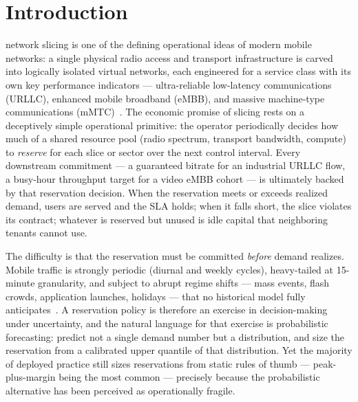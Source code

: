 \section{Introduction}
\label{sec:intro}

 network slicing is one of the defining operational
ideas of modern mobile networks: a single physical radio access and
transport infrastructure is carved into logically isolated virtual
networks, each engineered for a service class with its own key
performance indicators --- ultra-reliable low-latency communications
(URLLC), enhanced mobile broadband (eMBB), and massive machine-type
communications (mMTC)~\cite{rost2017network,afolabi2018slicing}.
The economic promise of slicing rests on a deceptively simple
operational primitive: the operator periodically decides how much of a
shared resource pool (radio spectrum, transport bandwidth, compute) to
\emph{reserve} for each slice or sector over the next control interval.
Every downstream commitment --- a guaranteed bitrate for an industrial
URLLC flow, a busy-hour throughput target for a video eMBB cohort ---
is ultimately backed by that reservation decision. When the reservation
meets or exceeds realized demand, users are served and the SLA holds;
when it falls short, the slice violates its contract; whatever is
reserved but unused is idle capital that neighboring tenants cannot
use.

The difficulty is that the reservation must be committed \emph{before}
demand realizes. Mobile traffic is strongly periodic (diurnal and
weekly cycles), heavy-tailed at 15-minute granularity, and subject to
abrupt regime shifts --- mass events, flash crowds, application
launches, holidays --- that no historical model fully
anticipates~\cite{shafiq2012cellular,sciancalepore2017mobile}. A reservation
policy is therefore an exercise in decision-making under uncertainty,
and the natural language for that exercise is probabilistic
forecasting: predict not a single demand number but a distribution, and
size the reservation from a calibrated upper quantile of that
distribution. Yet the majority of deployed practice still sizes
reservations from static rules of thumb --- peak-plus-margin being the
most common --- precisely because the probabilistic alternative has
been perceived as operationally fragile.

